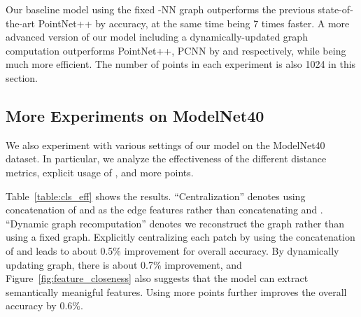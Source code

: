\documentclass[acmtog]{acmart}
\begin{document}
Our baseline model using the fixed -NN graph outperforms the previous state-of-the-art PointNet++ by  accuracy, at the same time being 7 times faster. 
A more advanced version of our model including a dynamically-updated graph computation outperforms PointNet++, PCNN by  and  respectively, while being much more efficient. The number of points in each experiment is also 1024 in this section.

\begin{table}[t]
\vskip 0.1in
\begin{center}
\end{center}
\caption{Complexity, forward time, and accuracy of different models}
\label{table:cls_time}
\end{table}


\subsection{More Experiments on ModelNet40}
\label{sec:effective_cls}
We also experiment with various settings of our model on the ModelNet40~\cite{wu20153d} dataset. In particular, we analyze the effectiveness of the different distance metrics, explicit usage of , and more points.

Table~\ref{table:cls_eff} shows the results. ``Centralization'' denotes using concatenation of  and  as the edge features rather than concatenating  and . ``Dynamic graph recomputation'' denotes we reconstruct the graph rather than using a fixed graph. Explicitly centralizing each patch by using the concatenation of  and  leads to about 0.5\% improvement for overall accuracy. By dynamically updating graph, there is about 0.7\% improvement, and Figure~\ref{fig:feature_closeness} also suggests that the model can extract semantically meanigful features. Using more points further improves the overall accuracy by 0.6\%.
\end{document}
